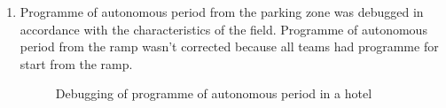 \begin{enumerate}
	\item Programme of autonomous period from the parking zone was debugged in accordance with the characteristics of the field. Programme of autonomous period from the ramp wasn't corrected because all teams had programme for start from the ramp.
	\begin{figure}[H]
		\begin{minipage}[h]{0.47\linewidth}
		\end{minipage}
		\hfill
		\begin{minipage}[h]{0.47\linewidth}
		\end{minipage}
		\caption{Debugging of programme of autonomous period in a hotel}
	\end{figure}
	
\end{enumerate}
\fillpage